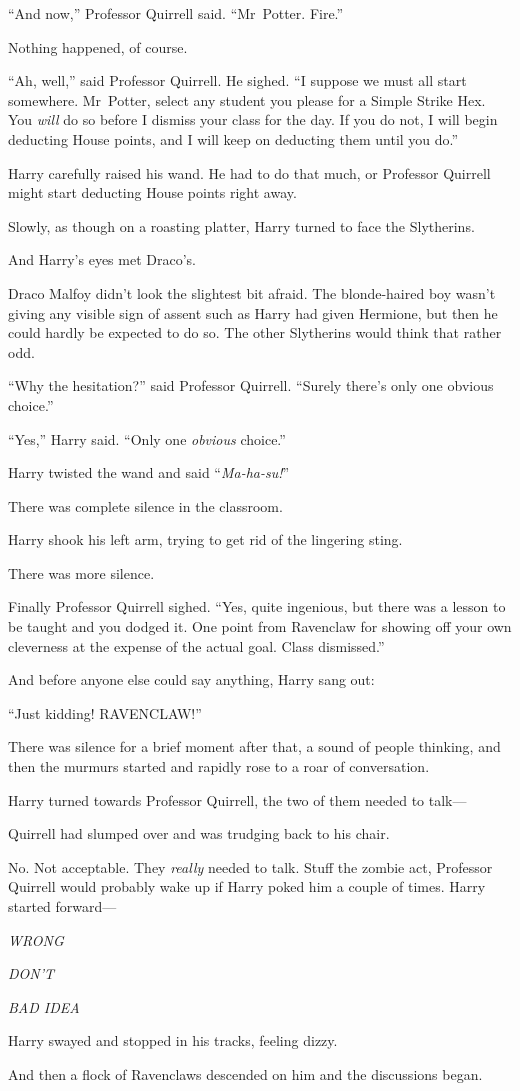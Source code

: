 “And now,” Professor Quirrell said. “Mr~Potter. Fire.”

Nothing happened, of course.

“Ah, well,” said Professor Quirrell. He sighed. “I suppose we must all start somewhere. Mr~Potter, select any student you please for a Simple Strike Hex. You \emph{will} do so before I dismiss your class for the day. If you do not, I will begin deducting House points, and I will keep on deducting them until you do.”

Harry carefully raised his wand. He had to do that much, or Professor Quirrell might start deducting House points right away.

Slowly, as though on a roasting platter, Harry turned to face the Slytherins.

And Harry’s eyes met Draco’s.

Draco Malfoy didn’t look the slightest bit afraid. The blonde-haired boy wasn’t giving any visible sign of assent such as Harry had given Hermione, but then he could hardly be expected to do so. The other Slytherins would think that rather odd.

“Why the hesitation?” said Professor Quirrell. “Surely there’s only one obvious choice.”

“Yes,” Harry said. “Only one \emph{obvious} choice.”

Harry twisted the wand and said “\emph{Ma-ha-su!}”

There was complete silence in the classroom.

Harry shook his left arm, trying to get rid of the lingering sting.

There was more silence.

Finally Professor Quirrell sighed. “Yes, quite ingenious, but there was a lesson to be taught and you dodged it. One point from Ravenclaw for showing off your own cleverness at the expense of the actual goal. Class dismissed.”

And before anyone else could say anything, Harry sang out:

“Just kidding! RAVENCLAW!”

There was silence for a brief moment after that, a sound of people thinking, and then the murmurs started and rapidly rose to a roar of conversation.

Harry turned towards Professor Quirrell, the two of them needed to talk—

Quirrell had slumped over and was trudging back to his chair.

No. Not acceptable. They \emph{really} needed to talk. Stuff the zombie act, Professor Quirrell would probably wake up if Harry poked him a couple of times. Harry started forward—

\emph{WRONG}

\emph{DON’T}

\emph{BAD IDEA}

Harry swayed and stopped in his tracks, feeling dizzy.

And then a flock of Ravenclaws descended on him and the discussions began.

